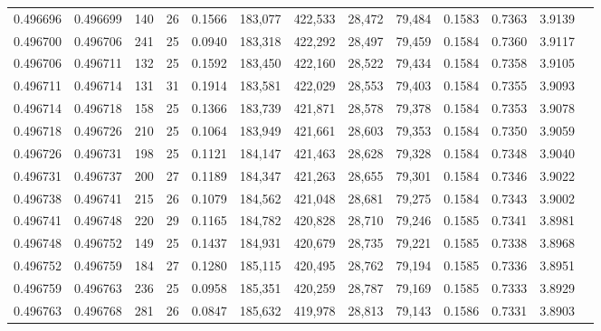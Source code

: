 \begin{tabular}{rrrrrrrrrrrrr}
0.496696 & 0.496699 & 140 &  26 &                                     0.1566 & 183,077 & 422,533 &  28,472 &  79,484 & 0.1583 & 0.7363 & 3.9139 \\
0.496700 & 0.496706 & 241 &  25 &                                     0.0940 & 183,318 & 422,292 &  28,497 &  79,459 & 0.1584 & 0.7360 & 3.9117 \\
0.496706 & 0.496711 & 132 &  25 &                                     0.1592 & 183,450 & 422,160 &  28,522 &  79,434 & 0.1584 & 0.7358 & 3.9105 \\
0.496711 & 0.496714 & 131 &  31 &                                     0.1914 & 183,581 & 422,029 &  28,553 &  79,403 & 0.1584 & 0.7355 & 3.9093 \\
0.496714 & 0.496718 & 158 &  25 &                                     0.1366 & 183,739 & 421,871 &  28,578 &  79,378 & 0.1584 & 0.7353 & 3.9078 \\
0.496718 & 0.496726 & 210 &  25 &                                     0.1064 & 183,949 & 421,661 &  28,603 &  79,353 & 0.1584 & 0.7350 & 3.9059 \\
0.496726 & 0.496731 & 198 &  25 &                                     0.1121 & 184,147 & 421,463 &  28,628 &  79,328 & 0.1584 & 0.7348 & 3.9040 \\
0.496731 & 0.496737 & 200 &  27 &                                     0.1189 & 184,347 & 421,263 &  28,655 &  79,301 & 0.1584 & 0.7346 & 3.9022 \\
0.496738 & 0.496741 & 215 &  26 &                                     0.1079 & 184,562 & 421,048 &  28,681 &  79,275 & 0.1584 & 0.7343 & 3.9002 \\
0.496741 & 0.496748 & 220 &  29 &                                     0.1165 & 184,782 & 420,828 &  28,710 &  79,246 & 0.1585 & 0.7341 & 3.8981 \\
0.496748 & 0.496752 & 149 &  25 &                                     0.1437 & 184,931 & 420,679 &  28,735 &  79,221 & 0.1585 & 0.7338 & 3.8968 \\
0.496752 & 0.496759 & 184 &  27 &                                     0.1280 & 185,115 & 420,495 &  28,762 &  79,194 & 0.1585 & 0.7336 & 3.8951 \\
0.496759 & 0.496763 & 236 &  25 &                                     0.0958 & 185,351 & 420,259 &  28,787 &  79,169 & 0.1585 & 0.7333 & 3.8929 \\
0.496763 & 0.496768 & 281 &  26 &                                     0.0847 & 185,632 & 419,978 &  28,813 &  79,143 & 0.1586 & 0.7331 & 3.8903 \\

\end{tabular}
